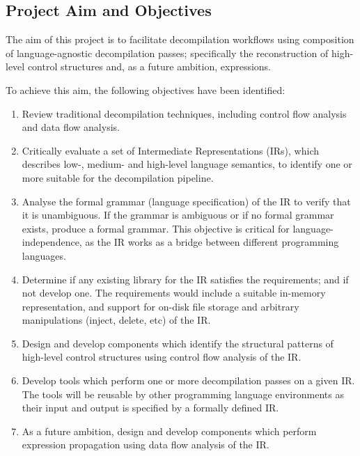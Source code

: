 
\subsection{Project Aim and Objectives}
\label{sec:project_aim_and_objectives}

The aim of this project is to facilitate decompilation workflows using composition of language-agnostic decompilation passes; specifically the reconstruction of high-level control structures and, as a future ambition, expressions.

To achieve this aim, the following objectives have been identified:
\begin{enumerate}
	\item Review traditional decompilation techniques, including control flow analysis and data flow analysis.
	\label{itm:obj_review_decomp_techniques}
	\item Critically evaluate a set of Intermediate Representations (IRs), which describes low-, medium- and high-level language semantics, to identify one or more suitable for the decompilation pipeline.
	\label{itm:obj_review_suitable_ir}
	\item Analyse the formal grammar (language specification) of the IR to verify that it is unambiguous. If the grammar is ambiguous or if no formal grammar exists, produce a formal grammar. This objective is critical for language-independence, as the IR works as a bridge between different programming languages.
	\label{itm:obj_formal_ir}
	\item Determine if any existing library for the IR satisfies the requirements; and if not develop one. The requirements would include a suitable in-memory representation, and support for on-disk file storage and arbitrary manipulations (inject, delete, etc) of the IR.
	\label{itm:obj_ir_library}
	\item Design and develop components which identify the structural patterns of high-level control structures using control flow analysis of the IR.
	\label{itm:obj_control_flow_analysis_component}
	\item Develop tools which perform one or more decompilation passes on a given IR. The tools will be reusable by other programming language environments as their input and output is specified by a formally defined IR.
	\label{itm:obj_decomp_pass_tool}
	\item As a future ambition, design and develop components which perform expression propagation using data flow analysis of the IR.
	\label{itm:obj_data_analysis_library}
\end{enumerate}
